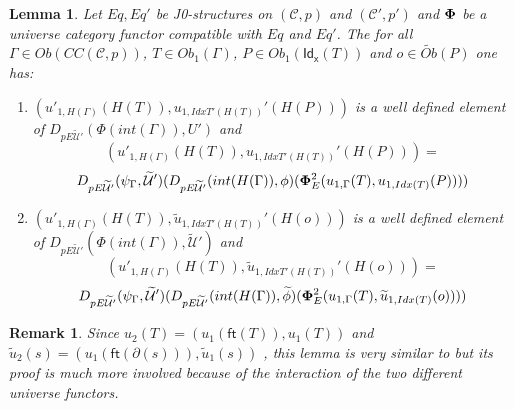 \documentclass[12pt]{article}
\numberwithin{equation}{section}
\newtheorem{lemma}[proposition]{Lemma}
\newtheorem{remark}[proposition]{Remark}
\newcommand{\llabel}[1]{\label{#1}}
\newcommand{\wt}{\widetilde}
\newcommand{\toCC}{CC} %
\newcommand{\ft}{\mathsf{ft}}
\newcommand{\Idx}{\mathsf{Id_x}} %
\newcommand{\U}{\mathcal{U}}
\begin{document}
\begin{lemma}
\llabel{2015.05.06.l3} Let $Eq, Eq'$ be J0-structures on $({\mathcal C},p)$ and
$({\mathcal C}',p')$ and $\bf\Phi$ be a universe category functor compatible
with $Eq$ and $Eq'$. The for all $\Gamma\in Ob(\toCC({\mathcal C},p))$, $T\in
Ob_1(\Gamma)$, $P\in Ob_1(\Idx(T))$ and $o\in \wt{Ob}(P)$ one has:
%
\begin{enumerate}
\item $(u'_{1,H(\Gamma)}(H(T)), u_{1,IdxT'(H(T))}'(H(P)))$ is a well defined
  element of $D_{pE\wt{\U}'}(\Phi(int(\Gamma)),U')$ and
%
$$(u'_{1,H(\Gamma)}(H(T)),
  u_{1,IdxT'(H(T))}'(H(P)))=$$$$D_{pE\wt{\U}'}(\psi_{\Gamma},\wt{\U}')(D_{pE\wt{\U}'}(int(H(\Gamma)),\phi)({\bf\Phi}_{E}^2(u_{1,\Gamma}(T),u_{1,Idx(T)}(P))))$$
%
\item $(u'_{1,H(\Gamma)}(H(T)), \wt{u}_{1,IdxT'(H(T))}'(H(o)))$ is a well
  defined element of $D_{pE\wt{\U}'}(\Phi(int(\Gamma)),\wt{\U}')$ and
%
$$(u'_{1,H(\Gamma)}(H(T)),
  \wt{u}_{1,IdxT'(H(T))}'(H(o)))=$$$$D_{pE\wt{\U}'}(\psi_{\Gamma},\wt{\U}')(D_{pE\wt{\U}'}(int(H(\Gamma)),\wt{\phi})({\bf\Phi}_{E}^2(u_{1,\Gamma}(T),\wt{u}_{1,Idx(T)}(o))))$$
%
\end{enumerate}
\end{lemma}
%
\begin{remark}\rm
Since $u_2(T)=(u_1(\ft(T)),u_1(T))$ and
$\wt{u}_2(s)=(u_1(\ft(\partial(s))),\wt{u}_1(s))$ , this lemma is very similar
to \cite[Lemma 6.1(3,4)]{fromunivwithPi} but its proof is much more involved
because of the interaction of the two different universe functors.
\end{remark}
%
\end{document}
